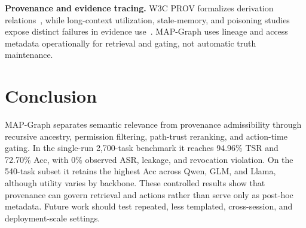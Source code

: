 \documentclass[letterpaper]{article} %
\begin{document}
\smallskip
\noindent\textbf{Provenance and evidence tracing.} W3C PROV formalizes derivation relations~\cite{belhajjame2013provdm,moreau2013prov}, while long-context utilization, stale-memory, and poisoning studies expose distinct failures in evidence use~\cite{liu2024lost,chao2026stale,dash2026memorypoisoning,pulipaka2026sleeper,zhang2026memmorph,wang2026mempoison}. MAP-Graph uses lineage and access metadata operationally for retrieval and gating, not automatic truth maintenance.

\section{Conclusion}
\label{sec:conclusion}

MAP-Graph separates semantic relevance from provenance admissibility through recursive ancestry, permission filtering, path-trust reranking, and action-time gating. In the single-run 2,700-task benchmark it reaches 94.96\% TSR and 72.70\% Acc, with 0\% observed ASR, leakage, and revocation violation. On the 540-task subset it retains the highest Acc across Qwen, GLM, and Llama, although utility varies by backbone. These controlled results show that provenance can govern retrieval and actions rather than serve only as post-hoc metadata. Future work should test repeated, less templated, cross-session, and deployment-scale settings.



\end{document}
